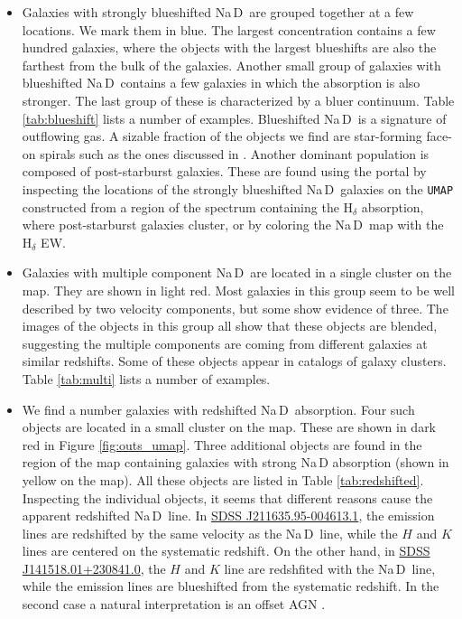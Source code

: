 \documentclass[fleqn,usenatbib]{mnras}
\def\nad{\mbox{Na\hspace{.5pt}{I}\,D}}
\begin{document}
{\begin{itemize}
\item Galaxies with strongly blueshifted \nad\ are grouped together at a few locations. We mark them in blue.  The largest concentration contains a few hundred galaxies, where the objects with the largest blueshifts are also the farthest from the bulk of the galaxies.   Another small group of galaxies with blueshifted \nad\ contains a few galaxies in which the absorption  is also stronger. The last group of these is characterized by a bluer continuum. Table \ref{tab:blueshift} lists a number of examples. 
 Blueshifted \nad\ is a signature of outflowing gas. A sizable fraction of the objects we find are star-forming face-on spirals such as the ones discussed in \citep{heckman02, bae18}. Another dominant population is composed of post-starburst galaxies. These are found using the portal by inspecting the locations of the strongly blueshifted \nad\ galaxies on the \texttt{UMAP} constructed from a region of the spectrum containing the H$_{\delta}$ absorption, where post-starburst galaxies cluster, or by coloring the \nad\ map with the H$_{\delta}$ EW. 

\item Galaxies with multiple component \nad\ are located in a single cluster on the map. They are shown in light red. Most galaxies in this group seem to be well described by two velocity components, but some show evidence of three. The images of the objects in this group all show that these objects are blended, suggesting the multiple components are coming from different galaxies at similar redshifts. Some of these objects appear in catalogs of galaxy clusters. Table \ref{tab:multi} lists a number of  examples.


\item We find a number galaxies with redshifted \nad\ absorption. Four such objects  are located in a small cluster on the map. These are shown in dark red  in Figure \ref{fig:outs_umap}. Three additional objects are found in the region of the map containing galaxies with strong \nad{} absorption (shown in yellow on the map). All these objects are listed in Table \ref{tab:redshifted}. Inspecting the individual objects, it seems that different reasons cause the apparent redshifted \nad\ line. In \href{http://skyserver.sdss.org/dr14/en/tools/explore/summary.aspx?sid=4718658695541530624&apid=}{SDSS J211635.95-004613.1}, the emission lines are redshifted by the same velocity as the \nad\ line, while the $H$ and $K$ lines are centered on the systematic redshift. On the other hand, in \href{http://skyserver.sdss.org/dr14/en/tools/explore/summary.aspx?sid=3135796793174943744&apid=}{SDSS J141518.01+230841.0}, the $H$ and $K$ line are redshfited with the \nad\ line, while the emission lines are blueshifted from the systematic redshift. In the second case a natural interpretation is an offset AGN \citep[e.g,][]{comerford14}. 



\end{itemize}}
\end{document}
